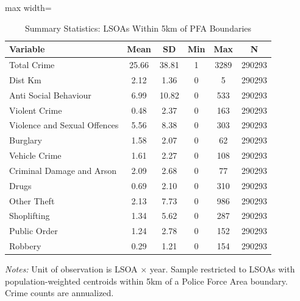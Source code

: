 \begin{table}[htbp]
\centering
\caption{Summary Statistics: LSOAs Within 5km of PFA Boundaries}
\label{tab:summary}
\begin{adjustbox}{max width=\textwidth}
\begin{tabular}{lccccc}
\toprule
Variable & Mean & SD & Min & Max & N \\
\midrule
Total Crime & 25.66 & 38.81 & 1 & 3289 & 290293 \\
Dist Km &  2.12 &  1.36 & 0 &    5 & 290293 \\
Anti Social Behaviour &  6.99 & 10.82 & 0 &  533 & 290293 \\
Violent Crime &  0.48 &  2.37 & 0 &  163 & 290293 \\
Violence and Sexual Offences &  5.56 &  8.38 & 0 &  303 & 290293 \\
Burglary &  1.58 &  2.07 & 0 &   62 & 290293 \\
Vehicle Crime &  1.61 &  2.27 & 0 &  108 & 290293 \\
Criminal Damage and Arson &  2.09 &  2.68 & 0 &   77 & 290293 \\
Drugs &  0.69 &  2.10 & 0 &  310 & 290293 \\
Other Theft &  2.13 &  7.73 & 0 &  986 & 290293 \\
Shoplifting &  1.34 &  5.62 & 0 &  287 & 290293 \\
Public Order &  1.24 &  2.78 & 0 &  152 & 290293 \\
Robbery &  0.29 &  1.21 & 0 &  154 & 290293 \\
\bottomrule
\end{tabular}
\end{adjustbox}
\parbox{\textwidth}{\footnotesize \textit{Notes:} Unit of observation is LSOA $\times$ year. Sample restricted to LSOAs with population-weighted centroids within 5km of a Police Force Area boundary. Crime counts are annualized.}
\end{table}
